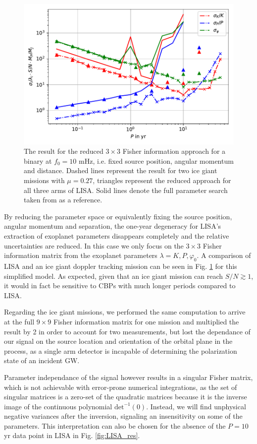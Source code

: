 \documentclass{aa}
\begin{document}
\begin{figure}
    \centering
    \includegraphics[width=.5\textwidth]{Tamanini_comp.pdf}
    \caption{The result for the reduced $3\times 3$ Fisher information approach for a binary at $f_0=10$ mHz, i.e. fixed source position, angular momentum and distance. Dashed lines represent the result for two ice giant missions with $\mu = 0.27$, triangles represent the reduced approach for all three arms of LISA. Solid lines denote the full parameter search taken from \citep{tamanini} as a reference.}
    \label{fig:comp_s}
\end{figure}

By reducing the parameter space or equivalently fixing the source position, angular momentum and separation, the one-year degeneracy for LISA's extraction of exoplanet parameters disappears completely and the relative uncertainties are reduced. In this case we only focus on the $3\times 3$ Fisher information matrix from the exoplanet parameters $\lambda=K,P,\varphi_0$. A comparison of LISA and an ice giant doppler tracking mission can be seen in Fig. \ref{fig:comp_s} for this simplified model. As expected, given that an ice giant mission can reach $S/N\gtrsim 1$, it would in fact be sensitive to CBPs with much longer periods compared to LISA.

Regarding the ice giant missions, we performed the same computation to arrive at the full $9 \times 9$ Fisher information matrix for one mission and multiplied the result by 2 in order to account for two measurements, but lost the dependance of our signal on the source location and orientation of the orbital plane in the process, as a single arm detector is incapable of determining the polarization state of an incident GW. 

Parameter independance of the signal however results in a singular Fisher matrix, which is not achievable with error-prone numerical integrations, as the set of singular matrices is a zero-set of the quadratic matrices because it is the inverse image of the continuous polynomial $\mathrm{det}^{-1}(0)$. Instead, we will find unphysical negative variances after the inversion, signaling an insensitivity on some of the parameters. This interpretation can also be chosen for the absence of the $P=10$ yr data point in LISA in Fig. \ref{fig:LISA_res}.
\end{document}
